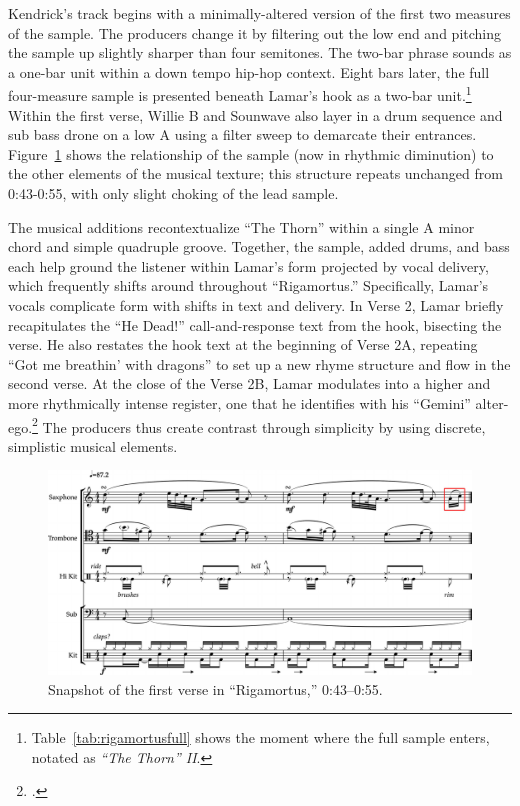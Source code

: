 Kendrick's track begins with a minimally-altered version of the first two measures of the 
sample. The producers change it by filtering out the low end and pitching the sample up 
slightly  sharper than four semitones. The two-bar phrase sounds as a one-bar unit within
a down tempo hip-hop context. Eight bars later, the full four-measure sample is presented
beneath Lamar's hook as a two-bar unit.\footnote{
    Table~\ref{tab:rigamortusfull} shows the moment where the full sample enters, notated
    as \textit{``The Thorn'' II}.}
Within the first verse, Willie B and Sounwave also layer in a drum sequence and sub bass 
drone on a low A using a filter sweep to demarcate their entrances. 
Figure~\ref{fig:rigamortusnoslip} shows the relationship of the sample (now in rhythmic
diminution) to the other elements of the musical texture; this structure repeats unchanged 
from 0:43-0:55, with only slight choking of the lead sample.

The musical additions recontextualize ``The Thorn'' within a single A minor chord and simple 
quadruple groove. Together, the sample, added drums, and bass each help ground the listener within 
Lamar's form projected by vocal delivery, which frequently shifts around throughout ``Rigamortus.''
Specifically, Lamar's vocals complicate form with shifts in text and delivery. In Verse 2, Lamar
briefly recapitulates the ``He Dead!'' call-and-response text from the hook, bisecting the verse.
He also restates the hook text at the beginning of Verse 2A, repeating ``Got me breathin' with 
dragons'' to set up a new rhyme structure and flow in the second verse. At the close of the Verse
2B, Lamar modulates into a higher and more rhythmically intense register, one that he identifies with 
his ``Gemini'' alter-ego.\footnote{
    \cite{chrismenchTrackingManyVoices2017}.}
The producers thus create contrast through simplicity by using discrete, simplistic musical elements.

\begin{figure}[ht]
    \centering
    \includegraphics[width=\textwidth]{images/figures/chp 02/043053rigamortusnoslip.pdf}
    \caption{Snapshot of the first verse in ``Rigamortus,'' 0:43--0:55.}
    \label{fig:rigamortusnoslip}
\end{figure}

